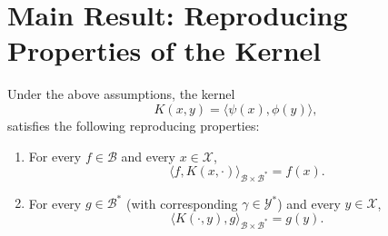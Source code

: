 \section{Main Result: Reproducing Properties of the Kernel}

\begin{theorem}
Under the above assumptions, the kernel
\[
K(x,y)=\langle \psi(x), \phi(y)\rangle,
\]
satisfies the following reproducing properties:
\begin{enumerate}
    \item For every \(f\in\mathcal{B}\) and every \(x\in\mathcal{X}\),
    \[
    \langle f, K(x,\cdot) \rangle_{\mathcal{B}\times \mathcal{B}^*} = f(x).
    \]
    \item For every \(g\in\mathcal{B}^*\) (with corresponding \(\gamma\in \mathcal{Y}^*\)) and every \(y\in\mathcal{X}\),
    \[
    \langle K(\cdot,y), g \rangle_{\mathcal{B}\times \mathcal{B}^*} = g(y).
    \]
\end{enumerate}
\end{theorem}

